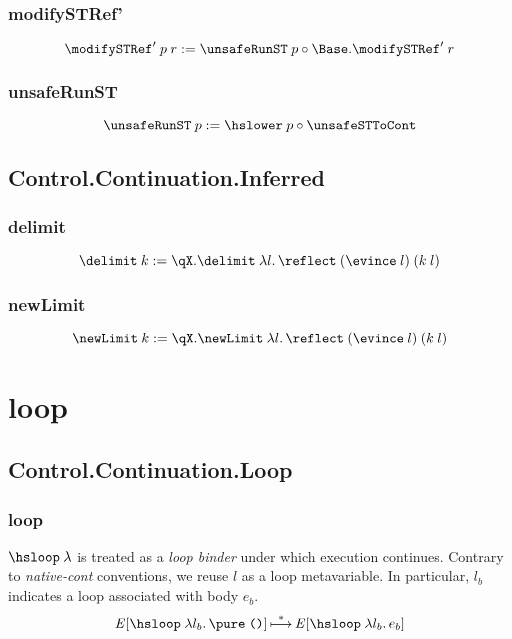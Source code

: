 \documentclass{report}
\begin{document}
\subsection{modifySTRef'}

\[
  \modifySTRef' \app p \app r
    := \unsafeRunST \app p \comp \Base\qual\modifySTRef' \app r
\]

\subsection{unsafeRunST}

\[
  \unsafeRunST \app p := \hslower \app p \comp \unsafeSTToCont
\]


\section{Control.Continuation.Inferred} %

\subsection{delimit}

\[
  \delimit \app k := \qX\qual\delimit \app \lam l {
    \reflect \app \br{\evince \app l} \app \br{k \app l}
  }
\]

\subsection{newLimit}

\[
  \newLimit \app k := \qX\qual\newLimit \app \lam l {
    \reflect \app \br{\evince \app l} \app \br{k \app l}
  }
\]



\chapter{loop} %

\section{Control.Continuation.Loop}

\subsection{loop}

\( \hsloop \app \lambda \) is treated as a \emph{loop binder} under which execution continues.
Contrary to \emph{native-cont} conventions, we reuse \( l \) as a loop metavariable.
In particular, \( l_b \) indicates a loop associated with body \( e_b \). \[
  {\E} \sq{\hsloop \app \lam {l_b} \pure \app \unit}
    \step^*
  {\E} \sq{\hsloop \app \lam {l_b} {e_b}}
\]
\end{document}
